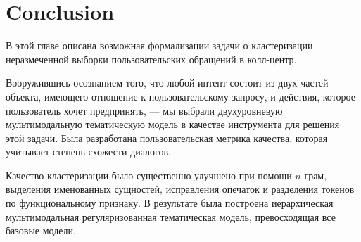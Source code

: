 \section{Conclusion}
В этой главе описана возможная формализации задачи о кластеризации неразмеченной выборки пользовательских обращений в колл-центр.

Вооружившись осознанием того, что любой интент состоит из двух частей --- объекта, имеющего отношение к пользовательскому запросу, и действия, которое пользователь хочет предпринять, --- мы выбрали двухуровневую мультимодальную тематическую модель в качестве инструмента для решения этой задачи. Была разработана пользовательская метрика качества, которая учитывает степень схожести диалогов.

Качество кластеризации было существенно улучшено при помощи $n$-грам, выделения именованных сущностей, исправления опечаток и разделения токенов по функциональному признаку. В результате была построена иерархическая мультимодальная регуляризованная тематическая модель, превосходящая все базовые модели.

